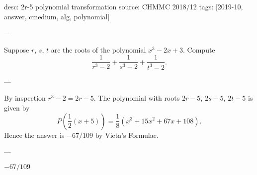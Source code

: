 desc: 2r-5 polynomial transformation
source: CHMMC 2018/12
tags: [2019-10, answer, cmedium, alg, polynomial]

---

Suppose $r$, $s$, $t$ are the roots of the polynomial $x^3-2x+3$. Compute \[\frac1{r^3-2}+\frac1{s^3-2}+\frac1{t^3-2}.\]

---

By inspection $r^3-2=2r-5$. The polynomial with roots $2r-5$, $2s-5$, $2t-5$ is given by \[P\left(\frac12(x+5)\right)=\frac18\left(x^3+15x^2+67x+108\right).\]
Hence the answer is $-67/109$ by Vieta's Formulae.

---

$-67/109$
